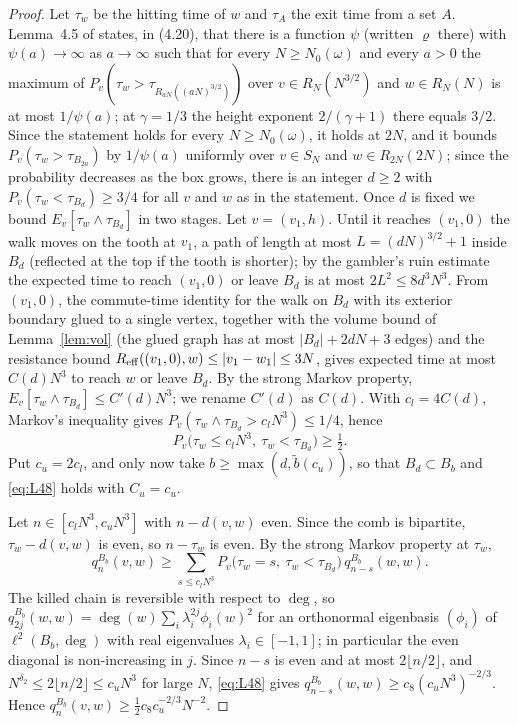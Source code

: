 \documentclass[11pt]{amsart}
\theoremstyle{remark}
\numberwithin{equation}{section}
\begin{document}
\begin{proof}
Let $\tau_w$ be the hitting time of $w$ and $\tau_A$ the exit time from a set $A$. Lemma~4.5 of \cite{DNNS} states, in (4.20), that there is a function $\psi$ (written $\varrho$ there) with $\psi(a)\to\infty$ as $a\to\infty$ such that for every $N\ge N_0(\omega)$ and every $a>0$ the maximum of $P_v(\tau_w>\tau_{R_{aN}((aN)^{3/2})})$ over $v\in R_N(N^{3/2})$ and $w\in R_N(N)$ is at most $1/\psi(a)$; at $\gamma=1/3$ the height exponent $2/(\gamma+1)$ there equals $3/2$. Since the statement holds for every $N\ge N_0(\omega)$, it holds at $2N$, and it bounds $P_v(\tau_w>\tau_{B_{2a}})$ by $1/\psi(a)$ uniformly over $v\in S_N$ and $w\in R_{2N}(2N)$; since the probability decreases as the box grows, there is an integer $d\ge2$ with $P_v(\tau_w<\tau_{B_d})\ge3/4$ for all $v$ and $w$ as in the statement. Once $d$ is fixed we bound $E_v[\tau_w\wedge\tau_{B_d}]$ in two stages. Let $v=(v_1,h)$. Until it reaches $(v_1,0)$ the walk moves on the tooth at $v_1$, a path of length at most $L=(dN)^{3/2}+1$ inside $B_d$ (reflected at the top if the tooth is shorter); by the gambler's ruin estimate the expected time to reach $(v_1,0)$ or leave $B_d$ is at most $2L^2\le8d^3N^3$. From $(v_1,0)$, the commute-time identity for the walk on $B_d$ with its exterior boundary glued to a single vertex, together with the volume bound of Lemma~\ref{lem:vol} (the glued graph has at most $|B_d|+2dN+3$ edges) and the resistance bound $R_{\rm eff}((v_1,0),w)\le|v_1-w_1|\le3N$, gives expected time at most $C(d)N^3$ to reach $w$ or leave $B_d$. By the strong Markov property, $E_v[\tau_w\wedge\tau_{B_d}]\le C'(d)N^3$; we rename $C'(d)$ as $C(d)$. With $c_l=4C(d)$, Markov's inequality gives $P_v(\tau_w\wedge\tau_{B_d}>c_lN^3)\le1/4$, hence
\[
P_v\bigl(\tau_w\le c_lN^3,\ \tau_w<\tau_{B_d}\bigr)\ge\tfrac12 .
\]
Put $c_u=2c_l$, and only now take $b\ge\max(d,\tilde b(c_u))$, so that $B_d\subset B_b$ and \eqref{eq:L48} holds with $C_u=c_u$.

Let $n\in[c_lN^3,c_uN^3]$ with $n-d(v,w)$ even. Since the comb is bipartite, $\tau_w-d(v,w)$ is even, so $n-\tau_w$ is even. By the strong Markov property at $\tau_w$,
\[
q^{B_b}_n(v,w)\ge\sum_{s\le c_lN^3}P_v\bigl(\tau_w=s,\ \tau_w<\tau_{B_d}\bigr)\,q^{B_b}_{n-s}(w,w).
\]
The killed chain is reversible with respect to $\deg$, so $q^{B_b}_{2j}(w,w)=\deg(w)\sum_i\lambda_i^{2j}\phi_i(w)^2$ for an orthonormal eigenbasis $(\phi_i)$ of $\ell^2(B_b,\deg)$ with real eigenvalues $\lambda_i\in[-1,1]$; in particular the even diagonal is non-increasing in $j$. Since $n-s$ is even and at most $2\lfloor n/2\rfloor$, and $N^{\delta_2}\le2\lfloor n/2\rfloor\le c_uN^3$ for large $N$, \eqref{eq:L48} gives $q^{B_b}_{n-s}(w,w)\ge c_8(c_uN^3)^{-2/3}$. Hence $q^{B_b}_n(v,w)\ge\frac12c_8c_u^{-2/3}N^{-2}$.
\end{proof}
\end{document}
